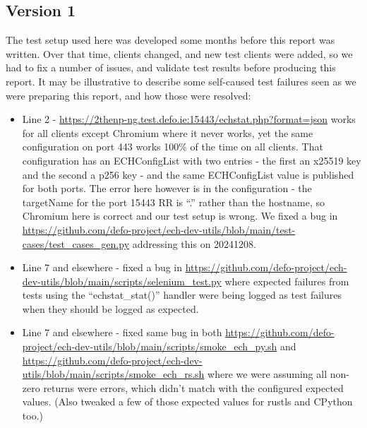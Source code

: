 \subsection{Version 1}

The test setup used here was developed some months before this report was
written.  Over that time, clients changed, and new test clients were added, so
we had to fix a number of issues, and validate test results before producing
this report. It may be illustrative to describe some self-caused test failures
seen as we were preparing this report, and how those were resolved:

\begin{itemize}

\item Line 2 -
    \url{https://2thenp-ng.test.defo.ie:15443/echstat.php?format=json} works
        for all clients except Chromium where it never works, yet the same
        configuration on port 443 works 100\% of the time on all clients. That
        configuration has an ECHConfigList with two entries - the first an
        x25519 key and the second a p256 key - and the same ECHConfigList value
        is published for both ports. The error here however is in the
        configuration - the targetName for the port 15443 RR is ``.'' rather
        than the hostname, so Chromium here is correct and our test setup is
        wrong. We fixed a bug in
        \url{https://github.com/defo-project/ech-dev-utils/blob/main/test-cases/test_cases_gen.py}
        addressing this on 20241208.\\

    \item Line 7 and elsewhere - fixed a bug in
        \url{https://github.com/defo-project/ech-dev-utils/blob/main/scripts/selenium_test.py}
        where expected failures from tests using the ``echstat\_stat()''
        handler were being logged as test failures when they should be logged
        as expected.

    \item Line 7 and elsewhere - fixed same bug in both
        \url{https://github.com/defo-project/ech-dev-utils/blob/main/scripts/smoke_ech_py.sh}
        and
        \url{https://github.com/defo-project/ech-dev-utils/blob/main/scripts/smoke_ech_rs.sh}
        where we were assuming all non-zero returns were errors, which didn't match with
        the configured expected values. (Also tweaked a few of those expected values for
        rustls and CPython too.)


\end{itemize}
